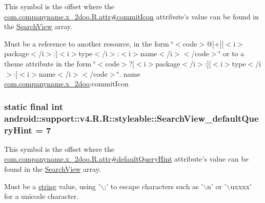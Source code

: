 This symbol is the offset where the \hyperlink{classcom_1_1companyname_1_1x__2doo_1_1_r_1_1attr_5ca5c429cbbc63b5e5145c03fba3506a}{com.companyname.x\_\-2doo.R.attr\#commitIcon} attribute's value can be found in the \hyperlink{classandroid_1_1support_1_1v4_1_1_r_1_1styleable_63a589da97c59fb7eebd9759edb31f0d}{SearchView} array.

Must be a reference to another resource, in the form \char`\"{}$<$code$>$@\mbox{[}+\mbox{]}\mbox{[}$<$i$>$package$<$/i$>$:\mbox{]}$<$i$>$type$<$/i$>$:$<$i$>$name$<$/i$>$$<$/code$>$\char`\"{} or to a theme attribute in the form \char`\"{}$<$code$>$?\mbox{[}$<$i$>$package$<$/i$>$:\mbox{]}\mbox{[}$<$i$>$type$<$/i$>$:\mbox{]}$<$i$>$name$<$/i$>$$<$/code$>$\char`\"{}.  name \hyperlink{namespacecom_1_1companyname_1_1x__2doo}{com.companyname.x\_\-2doo}:commitIcon \hypertarget{classandroid_1_1support_1_1v4_1_1_r_1_1styleable_269652287752b5c18c19cdf2cf0aeb52}{
\subsubsection[{SearchView\_\-defaultQueryHint}]{\setlength{\rightskip}{0pt plus 5cm}static final int android::support::v4.R.R::styleable::SearchView\_\-defaultQueryHint = 7}}
\label{classandroid_1_1support_1_1v4_1_1_r_1_1styleable_269652287752b5c18c19cdf2cf0aeb52}


This symbol is the offset where the \hyperlink{classcom_1_1companyname_1_1x__2doo_1_1_r_1_1attr_c53396a95110a93af6091f4b4ad337ad}{com.companyname.x\_\-2doo.R.attr\#defaultQueryHint} attribute's value can be found in the \hyperlink{classandroid_1_1support_1_1v4_1_1_r_1_1styleable_63a589da97c59fb7eebd9759edb31f0d}{SearchView} array.

Must be a \hyperlink{classandroid_1_1support_1_1v4_1_1_r_1_1string}{string} value, using '$\backslash$;' to escape characters such as '$\backslash$n' or '$\backslash$uxxxx' for a unicode character. 

